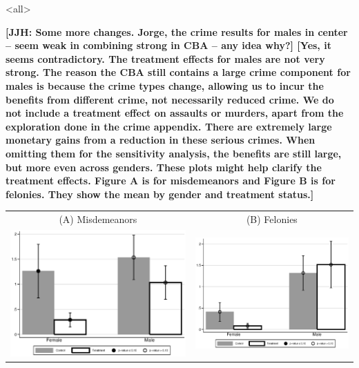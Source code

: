 \documentclass[static]{JJH-Beamer}
\begin{document}

\mode<all>{\theTitlePages} %


\textbf{[JJH: Some more changes. Jorge, the crime results for males in center -- seem weak in combining strong in CBA -- any idea why?] [Yes, it seems contradictory. The treatment effects for males are not very strong. The reason the CBA still contains a large crime component for males is because the crime types change, allowing us to incur the benefits from different crime, not necessarily reduced crime. We do not include a treatment effect on assaults or murders, apart from the exploration done in the crime appendix. There are extremely large monetary gains from a reduction in these serious crimes. When omitting them for the sensitivity analysis, the benefits are still large, but more even across genders. These plots might help clarify the treatment effects. Figure A is for misdemeanors and Figure B is for felonies. They show the mean by gender and treatment status.]
}

\begin{center}
\begin{tabular}{cc}
(A) Misdemeanors & (B) Felonies \\
\includegraphics[width=.45\textwidth]{output/MISDEMEANORS.eps}&
\includegraphics[width=.45\textwidth]{output/FELONIES.eps}
\end{tabular}
\end{center}
\end{document}
